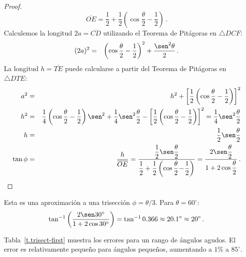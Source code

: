 \begin{proof}
\[
\overline{OE}=\frac{1}{2} + \frac{1}{2}\left(\cos \frac{\theta}{2}-\frac{1}{2}\right)\,.
\]
Calculemos la longitud $2a=\overline{CD}$ utilizando el Teorema de Pitágoras en $\triangle DCF$:
\begin{eqnarray*}
(2a)^2 &=&  \left(\cos \frac{\theta}{2}-\frac{1}{2}\right)^2+\frac{\sen^2\theta}{2}\,.
\end{eqnarray*}
La longitud $h=\overline{TE}$ puede calcularse a partir del Teorema de Pitágoras en $\triangle DTE$:
\begin{eqnarray*}
a^2 &=& h^2 + \left[\frac{1}{2}\left(\cos \frac{\theta}{2}-\frac{1}{2}\right)\right]^2\\
h^2&=&\frac{1}{4}\left(\cos \frac{\theta}{2}-\frac{1}{2}\right)\sen^2+\frac{1}{4}\sen^2\frac{\theta}{2}-\left[\frac{1}{2}\left(\cos \frac{\theta}{2}-\frac{1}{2}\right)\right]^2=
\frac{1}{4}\sen^2\frac{\theta}{2}\\
h&=&\frac{1}{2}\sen\frac{\theta}{2}\\
\tan\phi &=&\frac{h}{\overline{OE}}=\displaystyle\frac{\displaystyle\frac{1}{2}\sen\frac{\theta}{2}}{\displaystyle\frac{1}{2}+\frac{1}{2}\left(\cos \frac{\theta}{2}\! -\! \frac{1}{2}\right)}
=\frac{\displaystyle2\sen\frac{\theta}{2}}{\displaystyle 1+2\cos\frac{\theta}{2}}\,.
\end{eqnarray*}                  
\end{proof}

Esta es una aproximación a una trisección $\phi=\theta/3$. Para $\theta=60^\circ$:
\[
\tan^{-1}\left(\frac{2\sen 30^\circ}{1+2\cos 30^\circ}\right)=
\tan^{-1}0.366\approx 20.1^\circ\approx 20^\circ\,.
\]

Tabla~\ref{t.trisect-first} muestra los errores para un rango de ángulos agudos. El error es relativamente pequeño para ángulos pequeños, aumentando a $1\!\!$\% a $85^\circ$.


